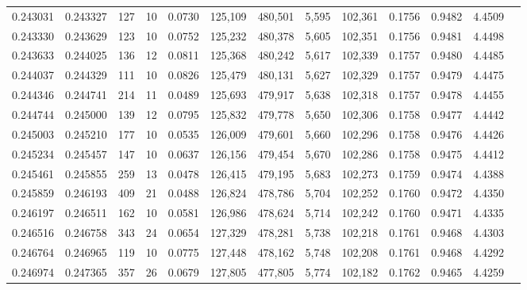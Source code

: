 \begin{tabular}{rrrrrrrrrrrrr}
0.243031 & 0.243327 &   127 &  10 &                                     0.0730 & 125,109 & 480,501 &   5,595 & 102,361 & 0.1756 & 0.9482 & 4.4509 \\
0.243330 & 0.243629 &   123 &  10 &                                     0.0752 & 125,232 & 480,378 &   5,605 & 102,351 & 0.1756 & 0.9481 & 4.4498 \\
0.243633 & 0.244025 &   136 &  12 &                                     0.0811 & 125,368 & 480,242 &   5,617 & 102,339 & 0.1757 & 0.9480 & 4.4485 \\
0.244037 & 0.244329 &   111 &  10 &                                     0.0826 & 125,479 & 480,131 &   5,627 & 102,329 & 0.1757 & 0.9479 & 4.4475 \\
0.244346 & 0.244741 &   214 &  11 &                                     0.0489 & 125,693 & 479,917 &   5,638 & 102,318 & 0.1757 & 0.9478 & 4.4455 \\
0.244744 & 0.245000 &   139 &  12 &                                     0.0795 & 125,832 & 479,778 &   5,650 & 102,306 & 0.1758 & 0.9477 & 4.4442 \\
0.245003 & 0.245210 &   177 &  10 &                                     0.0535 & 126,009 & 479,601 &   5,660 & 102,296 & 0.1758 & 0.9476 & 4.4426 \\
0.245234 & 0.245457 &   147 &  10 &                                     0.0637 & 126,156 & 479,454 &   5,670 & 102,286 & 0.1758 & 0.9475 & 4.4412 \\
0.245461 & 0.245855 &   259 &  13 &                                     0.0478 & 126,415 & 479,195 &   5,683 & 102,273 & 0.1759 & 0.9474 & 4.4388 \\
0.245859 & 0.246193 &   409 &  21 &                                     0.0488 & 126,824 & 478,786 &   5,704 & 102,252 & 0.1760 & 0.9472 & 4.4350 \\
0.246197 & 0.246511 &   162 &  10 &                                     0.0581 & 126,986 & 478,624 &   5,714 & 102,242 & 0.1760 & 0.9471 & 4.4335 \\
0.246516 & 0.246758 &   343 &  24 &                                     0.0654 & 127,329 & 478,281 &   5,738 & 102,218 & 0.1761 & 0.9468 & 4.4303 \\
0.246764 & 0.246965 &   119 &  10 &                                     0.0775 & 127,448 & 478,162 &   5,748 & 102,208 & 0.1761 & 0.9468 & 4.4292 \\
0.246974 & 0.247365 &   357 &  26 &                                     0.0679 & 127,805 & 477,805 &   5,774 & 102,182 & 0.1762 & 0.9465 & 4.4259 \\

\end{tabular}
